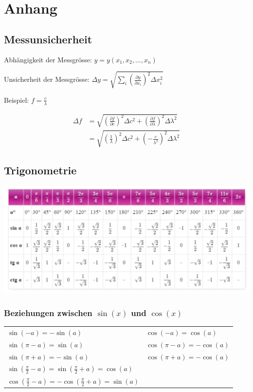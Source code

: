 \section{Anhang}


\subsection{Messunsicherheit}

Abhängigkeit der Messgrösse: $ y = y(x_1,x_2,...,x_n) $

Unsicherheit der Messgrösse: \( \Delta y = \sqrt{\sum_{i} \left( \frac{\partial y}{\partial x_i}\right)^2 \Delta x_i^2} \)

Beispiel: $ f = \frac{c}{\lambda} $

\begin{align*}
	\Delta f &= \sqrt{\left( \frac{\partial f}{\partial c}\right)^2 \Delta c^2 + \left( \frac{\partial f}{\partial \lambda}\right)^2 \Delta \lambda^2} \\
	         &= \sqrt{\left( \frac{1}{\lambda}\right)^2 \Delta c^2 + \left( - \frac{c}{\lambda^2}\right)^2 \Delta \lambda^2} 
\end{align*}



\subsection{Trigonometrie}
		
		
		\includegraphics[width=\linewidth]{Bilder/Wellen-Optik/trigo} %
		
		\subsubsection{Beziehungen zwischen $\sin(x)$ und $\cos(x)$}
		\begin{tabular}{ll}
		$\sin(-a) = -\sin(a)$ & $\cos(-a) = \cos(a)$ \\
		$\sin(\pi - a) = \sin(a)$ & $\cos(\pi -a) = - \cos(a)$ \\		
		$\sin(\pi + a) = -\sin(a)$ & $\cos(\pi + a) = - \cos(a)$ \\	
		$\sin(\frac{\pi}{2} - a) = \sin(\frac{\pi}{2} + a) = \cos(a)$ \\
		$\cos(\frac{\pi}{2} - a) = - \cos(\frac{\pi}{2} + a) = \sin(a)$\\		 
		\end{tabular}
		
